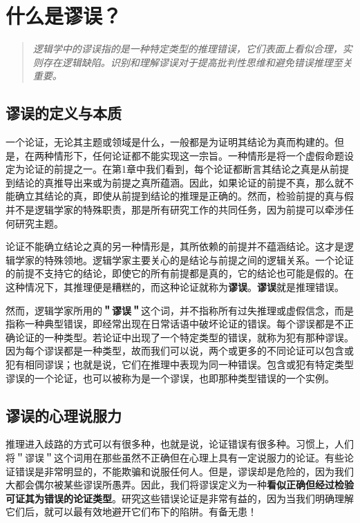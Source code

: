 \section{什么是谬误？}

\begin{quotation}
\textit{逻辑学中的谬误指的是一种特定类型的推理错误，它们表面上看似合理，实则存在逻辑缺陷。识别和理解谬误对于提高批判性思维和避免错误推理至关重要。}
\end{quotation}

\subsection{谬误的定义与本质}

一个论证，无论其主题或领域是什么，一般都是为证明其结论为真而构建的。但是，在两种情形下，任何论证都不能实现这一宗旨。一种情形是将一个虚假命题设定为论证的前提之一。在第1章中我们看到，每个论证都断言其结论之真是从前提到结论的真推导出来或为前提之真所蕴涵。因此，如果论证的前提不真，那么就不能确立其结论的真，即使从前提到结论的推理是正确的。然而，检验前提的真与假并不是逻辑学家的特殊职责，那是所有研究工作的共同任务，因为前提可以牵涉任何研究主题。

论证不能确立结论之真的另一种情形是，其所依赖的前提并不蕴涵结论。这才是逻辑学家的特殊领地。逻辑学家主要关心的是结论与前提之间的逻辑关系。一个论证的前提不支持它的结论，即使它的所有前提都是真的，它的结论也可能是假的。在这种情况下，其推理便是糟糕的，而这种论证就称为\textbf{谬误}。\textbf{谬误}就是推理错误。

然而，逻辑学家所用的\textbf{＂谬误＂}这个词，并不指称所有过失推理或虚假信念，而是指称一种典型错误，即经常出现在日常话语中破坏论证的错误。每个谬误都是不正确论证的一种类型。若论证中出现了一个特定类型的错误，就称为犯有那种谬误。因为每个谬误都是一种类型，故而我们可以说，两个或更多的不同论证可以包含或犯有相同谬误；也就是说，它们在推理中表现为同一种错误。包含或犯有特定类型谬误的一个论证，也可以被称为是一个谬误，也即那种类型错误的一个实例。

\subsection{谬误的心理说服力}

推理进入歧路的方式可以有很多种，也就是说，论证错误有很多种。习惯上，人们将＂谬误＂这个词用在那些虽然不正确但在心理上具有一定说服力的论证。有些论证错误是非常明显的，不能欺骗和说服任何人。但是，谬误却是危险的，因为我们大都会偶尔被某些谬误所愚弄。因此，我们将谬误定义为一种\textbf{看似正确但经过检验可证其为错误的论证类型}。研究这些错误论证是非常有益的，因为当我们明确理解它们后，就可以最有效地避开它们布下的陷阱。有备无患！


